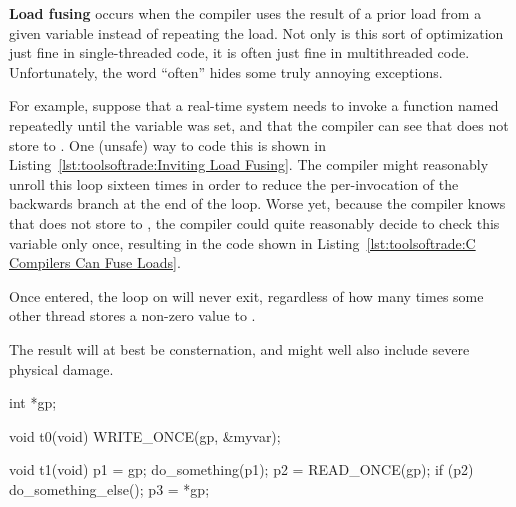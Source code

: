 {\bf Load fusing} occurs when the compiler uses the result of a
prior load from a given variable instead of repeating the load.
Not only is this sort of optimization just fine in single-threaded
code, it is often just fine in multithreaded code.
Unfortunately, the word ``often'' hides some truly annoying exceptions.

For example, suppose that a real-time system needs to invoke a
function named  repeatedly until the
variable  was set, and that the compiler can see
that  does not store to .
One (unsafe) way to code this is shown in
Listing~\ref{lst:toolsoftrade:Inviting Load Fusing}.
The compiler might reasonably unroll this loop sixteen times in order
to reduce the per-invocation of the backwards branch at the end of the
loop.
Worse yet, because the compiler knows that 
does not store to , the compiler could quite reasonably
decide to check this variable only once, resulting in the code shown in
Listing~\ref{lst:toolsoftrade:C Compilers Can Fuse Loads}.
\begin{fcvref}
Once entered, the loop on
 will never exit, regardless of how
many times some other thread stores a non-zero value to .
\end{fcvref}
The result will at best be consternation, and might well also
include severe physical damage.

\begin{listing}[tbp]
\begin{fcvlabel}
\begin{VerbatimL}[commandchars=\\\[\]]
int *gp; \lnlbl[gp]

void t0(void)
{
	WRITE_ONCE(gp, &myvar); \lnlbl[wgp]
}

void t1(void)
{
	p1 = gp; \lnlbl[p1]
	do_something(p1);
	p2 = READ_ONCE(gp); \lnlbl[p2]
	if (p2) { \lnlbl[if]
		do_something_else();
		p3 = *gp; \lnlbl[p3]
	}
}
\end{VerbatimL}
\end{fcvlabel}
\caption{C Compilers Can Fuse Non-Adjacent Loads}
\label{lst:toolsoftrade:C Compilers Can Fuse Non-Adjacent Loads}
\end{listing}

